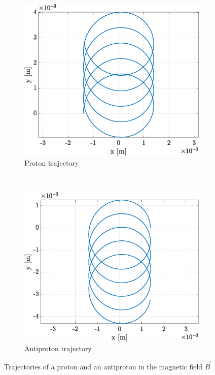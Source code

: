 \documentclass[a4paper,12pt,twoside]{article}
\begin{document}
\begin{figure}[h]
\centering
\begin{subfigure}[t]{0.45\textwidth}
	\includegraphics[width=\textwidth]{graphs/app2_ipos_traj.eps}
	\caption{Proton trajectory}
	\label{fig:app2-ipos-traj}
\end{subfigure}
~
\begin{subfigure}[t]{0.45\textwidth}
	\includegraphics[width=\textwidth]{graphs/app2_ineg_traj.eps}
	\caption{Antiproton trajectory}
	\label{fig:app2-ineg-traj}
\end{subfigure}
\caption{Trajectories of a proton and an antiproton in the magnetic field $\vec{B}$}
\label{fig:app2_i_traj}
\end{figure}
\end{document}
